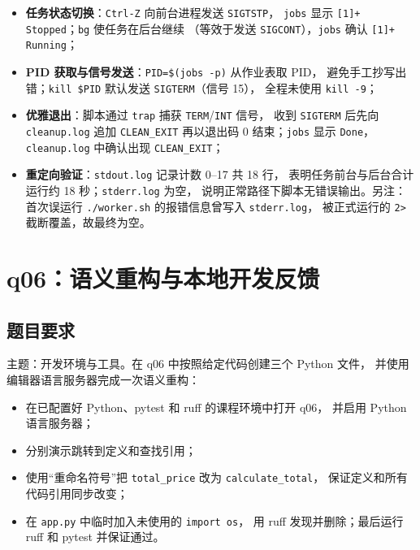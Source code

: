 \documentclass[a4paper,11pt]{ctexart}
\begin{document}
\begin{itemize}
  \item \textbf{任务状态切换}：\texttt{Ctrl-Z} 向前台进程发送 \texttt{SIGTSTP}，
        \texttt{jobs} 显示 \texttt{[1]+ Stopped}；\texttt{bg} 使任务在后台继续
        （等效于发送 \texttt{SIGCONT}），\texttt{jobs} 确认 \texttt{[1]+ Running}；
  \item \textbf{PID 获取与信号发送}：\texttt{PID=\$(jobs -p)} 从作业表取 PID，
        避免手工抄写出错；\texttt{kill \$PID} 默认发送 \texttt{SIGTERM}（信号 15），
        全程未使用 \texttt{kill -9}；
  \item \textbf{优雅退出}：脚本通过 \texttt{trap} 捕获 \texttt{TERM}/\texttt{INT} 信号，
        收到 \texttt{SIGTERM} 后先向 \texttt{cleanup.log} 追加 \texttt{CLEAN\_EXIT}
        再以退出码 0 结束；\texttt{jobs} 显示 \texttt{Done}，\texttt{cleanup.log}
        中确认出现 \texttt{CLEAN\_EXIT}；
  \item \textbf{重定向验证}：\texttt{stdout.log} 记录计数 0--17 共 18 行，
        表明任务前台与后台合计运行约 18 秒；\texttt{stderr.log} 为空，
        说明正常路径下脚本无错误输出。另注：首次误运行
        \texttt{./worker.sh} 的报错信息曾写入 \texttt{stderr.log}，
        被正式运行的 \texttt{2>} 截断覆盖，故最终为空。
\end{itemize}

\section{q06：语义重构与本地开发反馈}

\subsection{题目要求}

主题：开发环境与工具。在 q06 中按照给定代码创建三个 Python 文件，
并使用编辑器语言服务器完成一次语义重构：
\begin{itemize}
  \item 在已配置好 Python、pytest 和 ruff 的课程环境中打开 q06，
        并启用 Python 语言服务器；
  \item 分别演示跳转到定义和查找引用；
  \item 使用``重命名符号''把 \texttt{total\_price} 改为 \texttt{calculate\_total}，
        保证定义和所有代码引用同步改变；
  \item 在 \texttt{app.py} 中临时加入未使用的 \texttt{import os}，
        用 ruff 发现并删除；最后运行 ruff 和 pytest 并保证通过。
\end{itemize}
\end{document}
